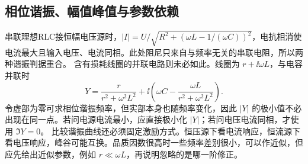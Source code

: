 \subsection{相位谐振、幅值峰值与参数依赖}
串联理想RLC接恒幅电压源时，$|I|=U/\sqrt{R^2+(\omega L-1/(\omega C))^2}$，电抗相消使电流最大且输入电压、电流同相。此处阻尼只来自与频率无关的串联电阻，所以两种谐振判据重合。
含有损耗线圈的并联电路则未必如此。线圈为 $r+\ii\omega L$，与电容并联时
\[
 Y=\frac{r}{r^2+\omega^2L^2}
 +\ii\left(\omega C-\frac{\omega L}{r^2+\omega^2L^2}\right).
\]
令虚部为零可求相位谐振频率，但实部本身也随频率变化，因此 $|Y|$ 的极小值不必出现在同一点。若问电源电流最小，应直接极小化 $|Y|$；若问电压电流同相，才使用 $\Im Y=0$。
比较谐振曲线还必须固定激励方式。恒压源下看电流响应，恒流源下看电压响应，峰谷可能互换。品质因数很高时一些频率差别很小，可以作近似，但应先给出近似参数，例如 $r\ll\omega L$，再说明忽略的是哪一阶修正。

